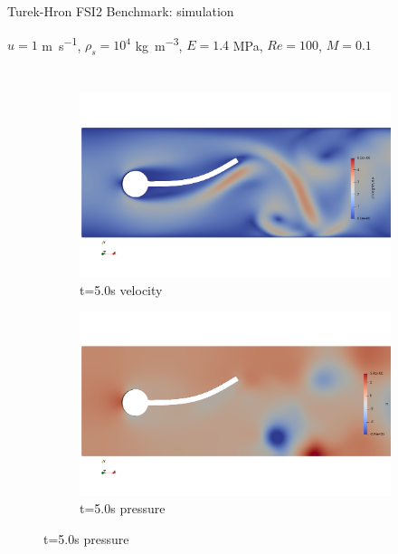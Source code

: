 \documentclass[10pt,t]{beamer}
\begin{document}
\begin{frame}{Turek-Hron FSI2 Benchmark: simulation}

$u=1$ \si{m.s^{-1}}, $\rho_s=10^4$ \si{kg.m^{-3}}, $E= 1.4$ \si{MPa}, $Re=100$, $M=0.1$

\begin{columns}


\begin{figure}[htb]
\centering %
\begin{subfigure}{0.5\textwidth}
  \includegraphics[width=\linewidth, trim=0 120 0 120, clip]{images/FSI2/fsi2_v1.png}
  \caption{t=5.0s velocity}
  \label{fig:fsi2_v1}
\end{subfigure}\hfil %
\begin{subfigure}{0.5\textwidth}
  \includegraphics[width=\linewidth, trim=0 120 0 120, clip]{images/FSI2/fsi2_p1.png}
  \caption{t=5.0s pressure}
  \label{fig:fsi2_p1}
\end{subfigure}\hfil %


\end{figure}
\end{columns}
\end{frame}
\end{document}
